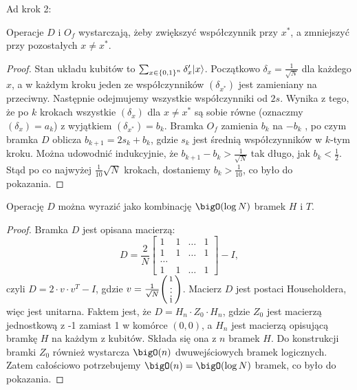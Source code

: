 Ad krok 2:
\begin{proposition}
    Operacje \( D \) i \( O_f \) wystarczają, żeby zwiększyć współczynnik przy \( x^{*} \), a zmniejszyć przy pozostałych \( x \neq x^{*} \).
\end{proposition}
\begin{proof}
    Stan układu kubitów to \( \sum_{x \in \set{0,1}^n} \delta'_x |x\rangle \). Początkowo \( \delta_x = \frac{1}{\sqrt{N}} \) dla każdego \( x \),
    a w każdym kroku jeden ze współczynników \( (\delta_{x^{*}}) \) jest zamieniany na przeciwny. Następnie odejmujemy wszystkie współczynniki od \( 2s \).
    Wynika z tego, że po \( k \) krokach wszystkie \( (\delta_x) \) dla \( x \neq x^{*} \) są sobie równe (oznaczmy \( (\delta_x) = a_k \)) z wyjątkiem \( (\delta_{x^{*}}) = b_k \).
    Bramka \( O_f \) zamienia \( b_k \) na \( -b_k \) , po czym bramka \( D \) oblicza \( b_{k+1} = 2s_k + b_k \), gdzie \( s_k \) jest średnią współczynników w \( k \)-tym kroku.
    Można udowodnić indukcyjnie, że \( b_{k+1} - b_k > \frac{1}{\sqrt{N}} \) tak długo, jak \( b_k < \frac{1}{2} \).
    Stąd po co najwyżej \( \frac{1}{10} \sqrt{N} \) krokach, dostaniemy \( b_k > \frac{1}{10} \), co było do pokazania.
\end{proof}
\begin{proposition}
    Operację \( D \) można wyrazić jako kombinację \( \bigO(\log N) \) bramek \( H \) i \( T \).
\end{proposition}
\begin{proof}
    Bramka \( D \) jest opisana macierzą:
    \[
        D = \frac{2}{N}
        \begin{bmatrix}
        1 & 1 & \ldots & 1 \\
        1 & 1 & \ldots & 1 \\
        \ldots \\
        1 & 1 & \ldots & 1
        \end{bmatrix}
        - I,
    \]
    czyli \( D = 2 \cdot v \cdot v^T - I \), gdzie \( v = \frac{1}{\sqrt{N}}
    \pars{\begin{smallmatrix}
    1 \\
    \vdots \\
    1
    \end{smallmatrix}} \).
    Macierz \( D \) jest postaci Householdera, więc jest unitarna. Faktem jest, że \( D = H_n \cdot Z_0 \cdot H_n \), gdzie \( Z_0 \) jest macierzą jednostkową z -1 zamiast 1 w komórce \( (0,0) \),
    a \( H_n \) jest macierzą opisującą bramkę \( H \) na każdym z kubitów. Składa się ona z \( n \) bramek \( H \). Do konstrukcji bramki \( Z_0 \) również wystarcza \( \bigO(n) \) dwuwejściowych bramek logicznych.
    Zatem całościowo potrzebujemy \( \bigO(n) = \bigO(\log N) \) bramek, co było do pokazania.
\end{proof}
